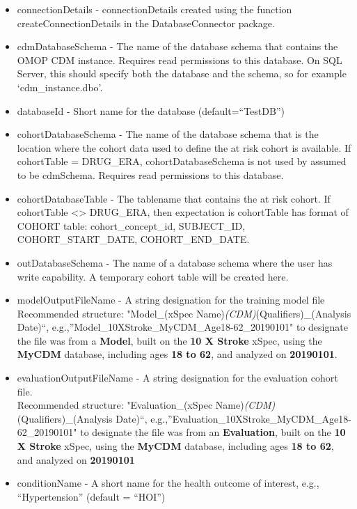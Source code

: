 \documentclass[
]{article}
\providecommand{\tightlist}{%
  \setlength{\itemsep}{0pt}\setlength{\parskip}{0pt}}
\begin{document}
\begin{itemize}
\tightlist
\item
  connectionDetails - connectionDetails created using the function
  createConnectionDetails in the DatabaseConnector package.
\item
  cdmDatabaseSchema - The name of the database schema that contains the
  OMOP CDM instance. Requires read permissions to this database. On SQL
  Server, this should specify both the database and the schema, so for
  example `cdm\_instance.dbo'.
\item
  databaseId - Short name for the database (default=``TestDB'')
\item
  cohortDatabaseSchema - The name of the database schema that is the
  location where the cohort data used to define the at risk cohort is
  available. If cohortTable = DRUG\_ERA, cohortDatabaseSchema is not
  used by assumed to be cdmSchema. Requires read permissions to this
  database.
\item
  cohortDatabaseTable - The tablename that contains the at risk cohort.
  If cohortTable \textless{}\textgreater{} DRUG\_ERA, then expectation
  is cohortTable has format of COHORT table: cohort\_concept\_id,
  SUBJECT\_ID, COHORT\_START\_DATE, COHORT\_END\_DATE.
\item
  outDatabaseSchema - The name of a database schema where the user has
  write capability. A temporary cohort table will be created here.
\item
  modelOutputFileName - A string designation for the training model file
  Recommended structure: "Model\_(xSpec
  Name)\emph{(CDM)}(Qualifiers)\_(Analysis Date)``,
  e.g.,''Model\_10XStroke\_MyCDM\_Age18-62\_20190101" to designate the
  file was from a \textbf{Model}, built on the \textbf{10 X Stroke}
  xSpec, using the \textbf{MyCDM} database, including ages \textbf{18 to
  62}, and analyzed on \textbf{20190101}.
\item
  evaluationOutputFileName - A string designation for the evaluation
  cohort file.\\
  Recommended structure: "Evaluation\_(xSpec
  Name)\emph{(CDM)}(Qualifiers)\_(Analysis Date)``,
  e.g.,''Evaluation\_10XStroke\_MyCDM\_Age18-62\_20190101" to designate
  the file was from an \textbf{Evaluation}, built on the \textbf{10 X
  Stroke} xSpec, using the \textbf{MyCDM} database, including ages
  \textbf{18 to 62}, and analyzed on \textbf{20190101}
\item
  conditionName - A short name for the health outcome of interest, e.g.,
  ``Hypertension'' (default = ``HOI'')

\end{itemize}
\end{document}
